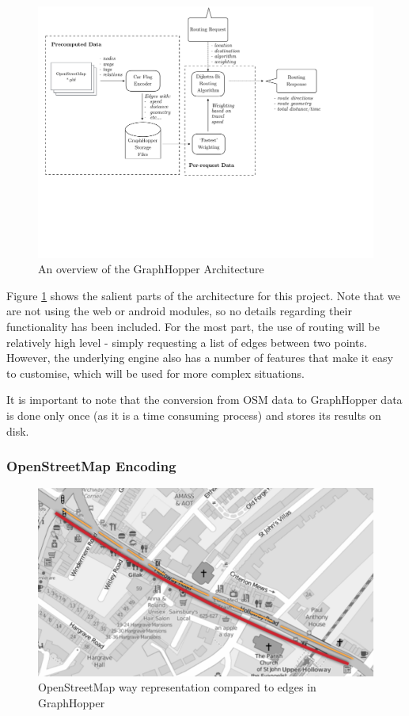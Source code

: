 \documentclass[ %
                    author={Alexander Hill},
                supervisor={Dr. Benjamin Sach},
                    degree={MEng},
                     title={MARMOSET},
                  subtitle={Multi-Agent Route Management using Online Simulation for Efficient Transportation},
                      type={research},
                      year={2016} ]{dissertation}
\begin{document}
\begin{figure}[p]
    \centering
    \includegraphics[scale=0.5,page=1,clip,trim=0 8cm 4cm 0]{architecture}
    \caption{An overview of the GraphHopper Architecture}\label{fig:gh-arch}
\end{figure}

Figure \ref{fig:gh-arch} shows the salient parts of the architecture for this project.
Note that we are not using the web or android modules, so no
details regarding their functionality has been included. For the most part, the
use of routing will be relatively high level - simply requesting a list of edges
between two points. However, the underlying engine also has a number of
features that make it easy to customise, which will be used for more complex
situations.

It is important to note that the conversion from OSM data to GraphHopper data
is done only once (as it is a time consuming process) and stores its results
on disk.

\subsubsection{OpenStreetMap Encoding}

\begin{figure}[p]
    \centering
    \includegraphics[scale=0.6]{osm-gh}
    \caption{OpenStreetMap way representation compared to edges in GraphHopper}\label{fig:osm-gh}
\end{figure}
\end{document}
